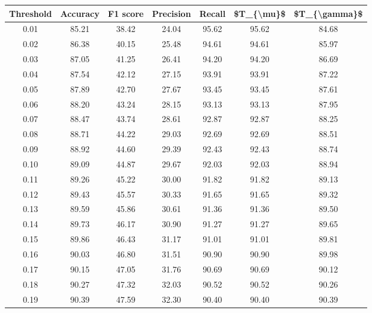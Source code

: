 \begin{tabular}{|c|c|c|c|c|c|c|}
\hline
 Threshold &  Accuracy &  F1 score &  Precision &  Recall &  \$T\_\{\textbackslash mu\}\$ &  \$T\_\{\textbackslash gamma\}\$ \\
\hline
      0.01 &     85.21 &     38.42 &      24.04 &   95.62 &      95.62 &         84.68 \\
      0.02 &     86.38 &     40.15 &      25.48 &   94.61 &      94.61 &         85.97 \\
      0.03 &     87.05 &     41.25 &      26.41 &   94.20 &      94.20 &         86.69 \\
      0.04 &     87.54 &     42.12 &      27.15 &   93.91 &      93.91 &         87.22 \\
      0.05 &     87.89 &     42.70 &      27.67 &   93.45 &      93.45 &         87.61 \\
      0.06 &     88.20 &     43.24 &      28.15 &   93.13 &      93.13 &         87.95 \\
      0.07 &     88.47 &     43.74 &      28.61 &   92.87 &      92.87 &         88.25 \\
      0.08 &     88.71 &     44.22 &      29.03 &   92.69 &      92.69 &         88.51 \\
      0.09 &     88.92 &     44.60 &      29.39 &   92.43 &      92.43 &         88.74 \\
      0.10 &     89.09 &     44.87 &      29.67 &   92.03 &      92.03 &         88.94 \\
      0.11 &     89.26 &     45.22 &      30.00 &   91.82 &      91.82 &         89.13 \\
      0.12 &     89.43 &     45.57 &      30.33 &   91.65 &      91.65 &         89.32 \\
      0.13 &     89.59 &     45.86 &      30.61 &   91.36 &      91.36 &         89.50 \\
      0.14 &     89.73 &     46.17 &      30.90 &   91.27 &      91.27 &         89.65 \\
      0.15 &     89.86 &     46.43 &      31.17 &   91.01 &      91.01 &         89.81 \\
      0.16 &     90.03 &     46.80 &      31.51 &   90.90 &      90.90 &         89.98 \\
      0.17 &     90.15 &     47.05 &      31.76 &   90.69 &      90.69 &         90.12 \\
      0.18 &     90.27 &     47.32 &      32.03 &   90.52 &      90.52 &         90.26 \\
      0.19 &     90.39 &     47.59 &      32.30 &   90.40 &      90.40 &         90.39 \\

\end{tabular}
